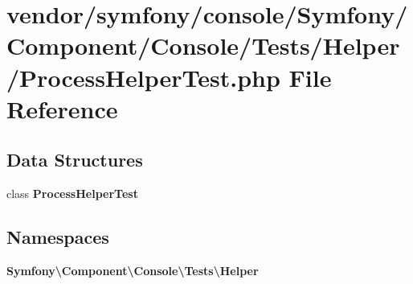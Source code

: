 \section{vendor/symfony/console/\+Symfony/\+Component/\+Console/\+Tests/\+Helper/\+Process\+Helper\+Test.php File Reference}
\label{_process_helper_test_8php}
\subsection*{Data Structures}
\begin{DoxyCompactItemize}
\item 
class {\bf Process\+Helper\+Test}
\end{DoxyCompactItemize}
\subsection*{Namespaces}
\begin{DoxyCompactItemize}
\item 
 {\bf Symfony\textbackslash{}\+Component\textbackslash{}\+Console\textbackslash{}\+Tests\textbackslash{}\+Helper}
\end{DoxyCompactItemize}
